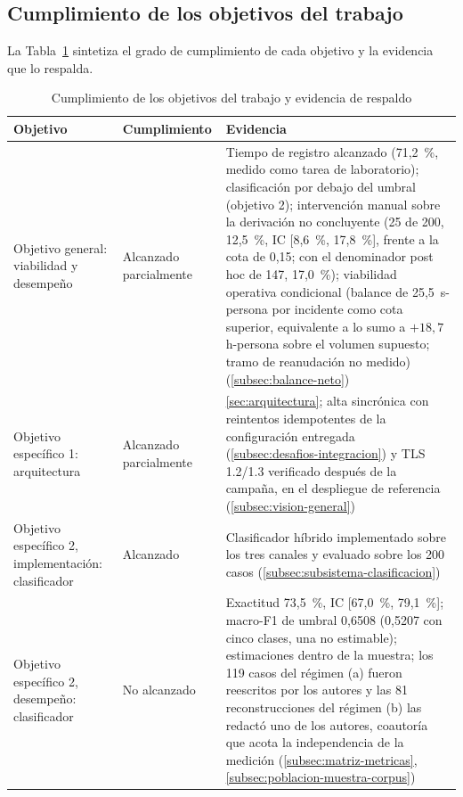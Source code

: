 \subsection{Cumplimiento de los objetivos del trabajo}\label{subsec:cumplimiento-objetivos}

La Tabla~\ref{tab:cumplimiento-objetivos} sintetiza el grado de cumplimiento de cada objetivo y la evidencia que lo respalda.

\begin{table}[htbp]
\centering
\caption{Cumplimiento de los objetivos del trabajo y evidencia de respaldo}
\label{tab:cumplimiento-objetivos}
\footnotesize
\setlength{\tabcolsep}{4pt}
\begin{tabular}{@{}>{\raggedright\arraybackslash}p{3.6cm} >{\raggedright\arraybackslash}p{2.2cm} >{\raggedright\arraybackslash}p{8.4cm}@{}}
\toprule
\textbf{Objetivo} & \textbf{Cumplimiento} & \textbf{Evidencia} \\
\midrule
Objetivo general: viabilidad y desempeño & Alcanzado parcialmente & Tiempo de registro alcanzado (71,2~\%, medido como tarea de laboratorio); clasificación por debajo del umbral (objetivo 2); intervención manual sobre la derivación no concluyente (25 de 200, 12,5~\%, IC [8,6~\%, 17,8~\%], frente a la cota de 0,15; con el denominador post hoc de 147, 17,0~\%); viabilidad operativa condicional (balance de 25,5~s-persona por incidente como cota superior, equivalente a lo sumo a \(+18{,}7\) h-persona sobre el volumen supuesto; tramo de reanudación no medido) (\autoref{subsec:balance-neto}) \\
Objetivo específico 1: arquitectura & Alcanzado parcialmente & \autoref{sec:arquitectura}; alta sincrónica con reintentos idempotentes de la configuración entregada (\autoref{subsec:desafios-integracion}) y TLS 1.2/1.3 verificado después de la campaña, en el despliegue de referencia (\autoref{subsec:vision-general}) \\
Objetivo específico 2, implementación: clasificador & Alcanzado & Clasificador híbrido implementado sobre los tres canales y evaluado sobre los 200 casos (\autoref{subsec:subsistema-clasificacion}) \\
Objetivo específico 2, desempeño: clasificador & No alcanzado & Exactitud 73,5~\%, IC [67,0~\%, 79,1~\%]; macro-F1 de umbral 0,6508 (0,5207 con cinco clases, una no estimable); estimaciones dentro de la muestra; los 119 casos del régimen (a) fueron reescritos por los autores y las 81 reconstrucciones del régimen (b) las redactó uno de los autores, coautoría que acota la independencia de la medición (\autoref{subsec:matriz-metricas}, \autoref{subsec:poblacion-muestra-corpus}) \\

\end{tabular}
\end{table}
